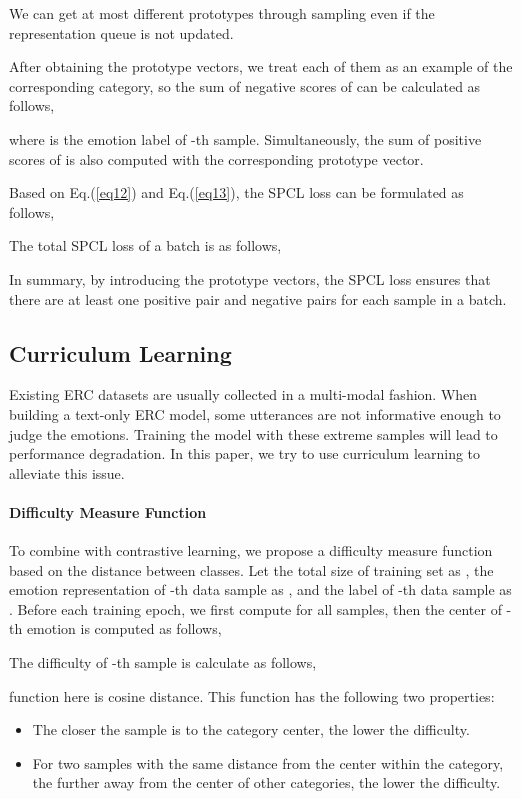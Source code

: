 \documentclass[11pt]{article}
\begin{document}
We can get at most  different prototypes through sampling even if the representation queue is not updated.

After obtaining the prototype vectors, we treat each of them as an example of the corresponding category, so the sum of negative scores of  can be calculated as follows,



where  is the emotion label of -th sample.
Simultaneously, the sum of positive scores of  is also computed with the corresponding prototype vector.

Based on Eq.(\ref{eq12}) and Eq.(\ref{eq13}), the SPCL loss can be formulated as follows,


The total SPCL loss of a batch is as follows,


In summary, by introducing the prototype vectors, the SPCL loss ensures that there are at least one positive pair and  negative pairs for each sample in a batch.

\subsection{Curriculum Learning}
\label{cl}
Existing ERC datasets are usually collected in a multi-modal fashion. When building a text-only ERC model, some utterances are not informative enough to judge the emotions. Training the model with these extreme samples will lead to performance degradation. In this paper, we try to use curriculum learning to alleviate this issue. 
\paragraph{Difficulty Measure Function} To combine with contrastive learning, we propose a difficulty measure function based on the distance between classes. Let the total size of training set  as , the emotion representation of -th data sample as , and the label of -th data sample as . Before each training epoch, we first compute  for all samples, then the center of -th emotion is computed as follows,


The difficulty of -th sample  is calculate as follows,


 function here is cosine distance. This function has the following two properties:
\begin{itemize}
    \item The closer the sample is to the category center, the lower the difficulty.
    \item For two samples with the same distance from the center within the category, the further away from the center of other categories, the lower the difficulty.
\end{itemize}
\end{document}
